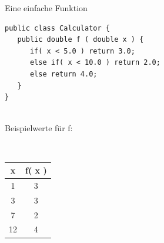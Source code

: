 \begin{frame}[t,fragile]{Eine einfache Funktion} %
\begin{lstlisting}
public class Calculator {   
   public double f ( double x ) {
      if( x < 5.0 ) return 3.0;
      else if( x < 10.0 ) return 2.0;
      else return 4.0;
   }
}
\end{lstlisting}

\begin{minipage}[t]{3.5cm}
~ \\
Beispielwerte für f:

~ \\
\begin{tabular}{|c|c|}
\textbf{x} & \textbf{f( x )}  \\ \hline
1 & 3  \\
3 & 3  \\
7 & 2  \\
12 & 4
\end{tabular} 
\end{minipage} 
\hfill
\begin{minipage}[t]{4.5cm}
~ \\
\vspace{-1em}\\

\end{minipage}
\end{frame}
